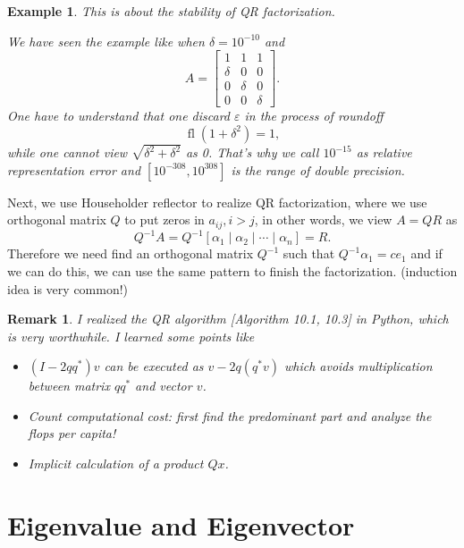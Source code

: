 \documentclass[dvipsnames, 12pt]{article}
\newtheorem{Example}[Theorem]{Example}
\newtheorem{Remark}[Theorem]{Remark}
\begin{document}
\begin{Example}\label{example03}
    This is about the stability of QR factorization.

    We have seen the example like when $\delta=10^{-10}$ and 
    $$
    A=\left[\begin{array}{ccc}
    1 & 1 & 1\\
    \delta &0 &0 \\
    0 & \delta & 0\\
    0 & 0& \delta
    \end{array}\right].
    $$
    One have to understand that one discard $\varepsilon$ in the process of roundoff 
    $$
    \operatorname{fl}(1+\delta^{2})=1,
    $$
    while one cannot view $\sqrt{\delta^{2}+\delta^{2}}$ as 0. That's why we call $10^{-15}$ as relative representation error and $[10^{-308}, 10^{308}]$ is the range of double precision.
\end{Example}




Next, we use Householder reflector to realize QR factorization, where we use orthogonal matrix $Q$ to put zeros in $a_{ij},i>j$, in other words, we view $A=QR$ as
$$
Q^{-1}A=Q^{-1}[\alpha_{1}\mid \alpha_{2} \mid\cdots \mid\alpha_{n}]=R.
$$
Therefore we need find an orthogonal matrix $Q^{-1}$ such that $Q^{-1}\alpha_{1}=ce_{1}$ and if we can do this, we can use the same pattern to finish the factorization. (induction idea is very common!)



\begin{Remark}
    I realized the QR algorithm \cite{trefethen2022numerical}[Algorithm 10.1, 10.3] in Python, which is very worthwhile. I learned some points like
    \begin{itemize}
        \item $(I-2qq^{*})v$ can be executed as $v - 2q(q^{*}v)$ which avoids multiplication between matrix $qq^{*}$ and vector $v$.
        
        \item Count computational cost: first find the predominant part and analyze the flops per capita!

        \item Implicit calculation of a product $Qx$.
    \end{itemize}
\end{Remark}


\newpage
\section{Eigenvalue and Eigenvector}
\end{document}
